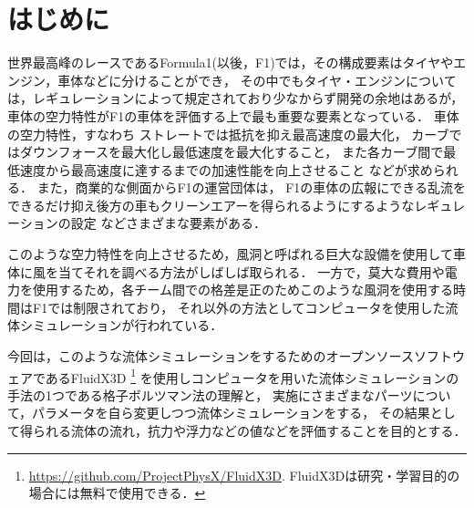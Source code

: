 \documentclass[main]{subfiles}
\begin{document}
\chapter{はじめに}

世界最高峰のレースであるFormula1(以後，F1)では，その構成要素はタイヤやエンジン，車体などに分けることができ，
その中でもタイヤ・エンジンについては，レギュレーションによって規定されており少なからず開発の余地はあるが，車体の空力特性がF1の車体を評価する上で最も重要な要素となっている．\cite{ref:f1-wind-tunnel}
車体の空力特性，すなわち
ストレートでは抵抗を抑え最高速度の最大化，
カーブではダウンフォースを最大化し最低速度を最大化すること，
また各カーブ間で最低速度から最高速度に達するまでの加速性能を向上させること
などが求められる．
また，商業的な側面からF1の運営団体は，
F1の車体の広報にできる乱流をできるだけ抑え後方の車もクリーンエアーを得られるようにするようなレギュレーションの設定
などさまざまな要素がある．

このような空力特性を向上させるため，風洞と呼ばれる巨大な設備を使用して車体に風を当てそれを調べる方法がしばしば取られる．
一方で，莫大な費用や電力を使用するため，各チーム間での格差是正のためこのような風洞を使用する時間はF1では制限されており\cite{ref:f1-sporting-regulations}，
それ以外の方法としてコンピュータを使用した流体シミュレーションが行われている．

今回は，このような流体シミュレーションをするためのオープンソースソフトウェアであるFluidX3D
\footnote{
    \url{https://github.com/ProjectPhysX/FluidX3D}.
    FluidX3Dは研究・学習目的の場合には無料で使用できる．
}
を使用しコンピュータを用いた流体シミュレーションの手法の1つである格子ボルツマン法の理解と，
実施にさまざまなパーツについて，パラメータを自ら変更しつつ流体シミュレーションをする，
その結果として得られる流体の流れ，抗力や浮力などの値などを評価することを目的とする．
\end{document}
